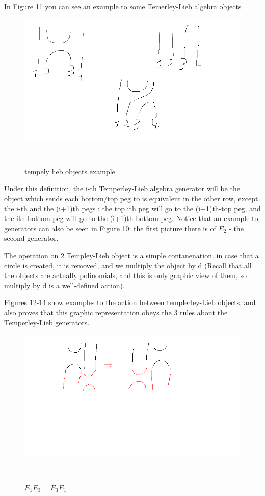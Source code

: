 \documentclass{article}
\begin{document}
In Figure 11 you can see an example to some Temerley-Lieb algebra objects
\begin{figure}
\includegraphics[scale=0.25]{tempely_lieb_generators} 
\caption{tempely lieb objects example}\
\end{figure}

Under this definition, the i-th Temperley-Lieb algebra generator will be the object which sends each bottom/top peg to is equivalent in the other row, except the i-th and the (i+1)th pegs : the top ith peg will go to the (i+1)th-top peg, and the ith bottom peg will go to the (i+1)th bottom peg. Notice that an example to generators can also be seen in Figure 10: the first picture there is of $E_{2}$ - the second generator.

The operation on 2 Templey-Lieb object is a simple contanenation. in case that a circle is created, it is removed, and we multiply the object by d (Recall that all the objects are actually polinomials, and this is only graphic view of them, so multiply by d is a well-defined action).

Figures 12-14 show examples to the action between templerley-Lieb objects, and also proves that this graphic representation obeys the 3 rules about the Temperley-Lieb generators.
\begin{figure}
\includegraphics[scale=0.5]{tempely_lieb_first_rule} 
\caption{$E_{1}E_{3}=E_{3}E_{1}$}\
\end{figure}
\end{document}
